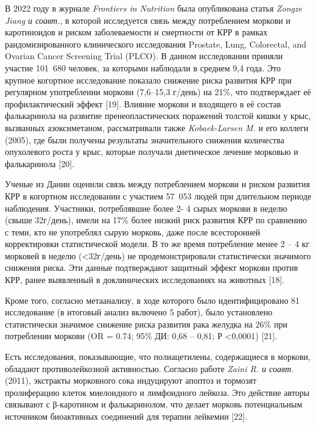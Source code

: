 В 2022 году в журнале \emph{Frontiers in Nutrition} была опубликована
статья \emph{Zongze Jiang и соавт.}, в которой исследуется связь между
потреблением моркови и каротиноидов и риском заболеваемости и смертности
от КРР в рамках рандомизированного клинического исследования Prostate,
Lung, Colorectal, and Ovarian Cancer Screening Trial (PLCO). В данном
исследовании приняли участие 101~680 человек, за которыми наблюдали в
среднем 9,4 года. Это крупное когортное исследование показало снижение
риска развития КРР при регулярном употреблении моркови (7,6--15,3
г/день) на 21\%, что подтверждает её профилактический эффект {[}19{]}.
Влияние моркови и входящего в её состав фалькаринола на развитие
пренеопластических поражений толстой кишки у крыс, вызванных
азоксиметаном, рассматривали также \emph{Kobaek-Larsen M.} и его коллеги
(2005), где были получены результаты значительного снижения количества
опухолевого роста у крыс, которые получали диетическое лечение морковью
и фалькаринола {[}20{]}.

Ученые из Дании оценили связь между потреблением моркови и риском
развития КРР в когортном исследовании с участием 57~053 людей при
длительном периоде наблюдения. Участники, потреблявшие более 2- 4 сырых
моркови в неделю (свыше 32г/день), имели на 17\% более низкий риск
развития КРР по сравнению с теми, кто не употреблял сырую морковь, даже
после всесторонней корректировки статистической модели. В то же время
потребление менее 2 -- 4 кг морковей в неделю (\textless32г/день) не
продемонстрировали статистически значимого снижения риска. Эти данные
подтверждают защитный эффект моркови против КРР, ранее выявленный в
доклинических исследованиях на животных {[}18{]}.

Кроме того, согласно метаанализу, в ходе которого было идентифицировано
81 исследование (в итоговый анализ включено 5 работ), было установлено
статистически значимое снижение риска развития рака желудка на 26\% при
потреблении моркови (OR = 0.74; 95\% ДИ: 0,68 -- 0,81; Р
\textless0,0001) {[}21{]}.

Есть исследования, показывающие, что полиацетилены, содержащиеся в
моркови, обладают противолейкозной активностью. Согласно работе
\emph{Zaini R. и соавт.} (2011), экстракты морковного сока индуцируют
апоптоз и тормозят пролиферацию клеток миелоидного и лимфоидного
лейкоза. Это действие авторы связывают с β-каротином и фалькаринолом,
что делает морковь потенциальным источником биоактивных соединений для
терапии лейкемии {[}22{]}.

